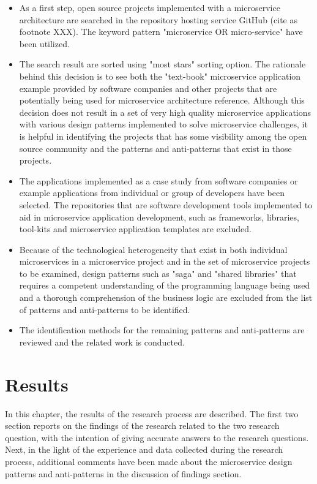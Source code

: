 \documentclass{Configuration_Files/PoliMi3i_thesis}
\begin{document}
\begin{itemize}
    \item As a first step, open source projects implemented with a microservice architecture are searched in the repository hosting service GitHub (cite as footnote XXX).
    The keyword pattern "microservice OR micro-service" have been utilized.

    \item The search result are sorted using "most stars" sorting option.
    The rationale behind this decision is to see both the "text-book" microservice application example provided by software companies and other projects that are potentially being used for microservice architecture reference.
    Although this decision does not result in a set of very high quality microservice applications with various design patterns implemented to solve microservice challenges, it is helpful in identifying the projects that has some visibility among the open source community and the patterns and anti-patterns that exist in those projects.
    
    \item The applications implemented as a case study from software companies or example applications from individual or group of developers have been selected.
    The repositories that are software development tools implemented to aid in microservice application development, such as frameworks, libraries, tool-kits and microservice application templates are excluded.
    
    \item Because of the technological heterogeneity that exist in both individual microservices in a microservice project and in the set of microservice projects to be examined, design patterns such as "saga" and "shared libraries" that requires a competent understanding of the programming language being used and a thorough comprehension of the business logic are excluded from the list of patterns and anti-patterns to be identified.
    
    \item The identification methods for the remaining patterns and anti-patterns are reviewed and the related work is conducted.
\end{itemize}


\chapter{Results}
\label{ch:results}%

In this chapter, the results of the research process are described.
The first two section reports on the findings of the research related to the two research question, with the intention of giving accurate answers to the research questions.
Next, in the light of the experience and data collected during the research process, additional comments have been made about the microservice design patterns and anti-patterns in the discussion of findings section.
\end{document}
